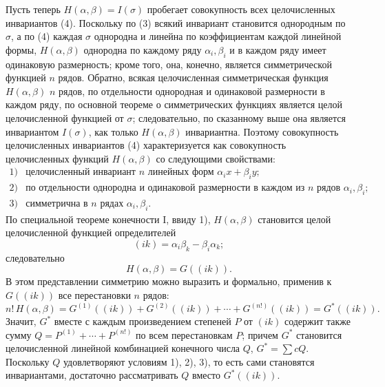 \documentclass[11pt]{article}
\begin{document}
Пусть теперь \(H(\alpha,\beta)=I(\sigma)\) пробегает совокупность всех целочисленных инвариантов (4). Поскольку по (3) всякий инвариант становится однородным по \(\sigma\), а по (4) каждая \(\sigma\) однородна и линейна по коэффициентам каждой линейной формы, \(H(\alpha,\beta)\) однородна по каждому ряду \(\alpha_i,\beta_i\) и в каждом ряду имеет одинаковую размерность; кроме того, она, конечно, является симметрической функцией \(n\) рядов. Обратно, всякая целочисленная симметрическая функция \(H(\alpha,\beta)\) \(n\) рядов, по отдельности однородная и одинаковой размерности в каждом ряду, по основной теореме о симметрических функциях является целой целочисленной функцией от \(\sigma\); следовательно, по сказанному выше она является инвариантом \(I(\sigma)\), как только \(H(\alpha,\beta)\) инвариантна. Поэтому совокупность целочисленных инвариантов (4) характеризуется как совокупность целочисленных функций \(H(\alpha,\beta)\) со следующими свойствами:
\[
\begin{array}{ll}
1) & \text{целочисленный инвариант \(n\) линейных форм \(\alpha_i x+\beta_i y\);}\\
2) & \text{по отдельности однородна и одинаковой размерности в каждом из \(n\) рядов \(\alpha_i,\beta_i\);}\\
3) & \text{симметрична в \(n\) рядах \(\alpha_i,\beta_i\).}
\end{array}
\]
По специальной теореме конечности I, ввиду 1), \(H(\alpha,\beta)\) становится целой целочисленной функцией определителей
\[
        (ik)=\alpha_i\beta_k-\beta_i\alpha_k;
\]
следовательно
\[
        H(\alpha,\beta)=G((ik)).
\]
В этом представлении симметрию можно выразить и формально, применив к \(G((ik))\) все перестановки \(n\) рядов:
\begin{equation}
        n!\,H(\alpha,\beta)
        =
        G^{(1)}((ik))+G^{(2)}((ik))+\cdots+G^{(n!)}((ik))
        =G^*((ik)).
\end{equation}
Значит, \(G^*\) вместе с каждым произведением степеней \(P\) от \((ik)\) содержит также сумму \(Q=P^{(1)}+\cdots+P^{(n!)}\) по всем перестановкам \(P\); причем \(G^*\) становится целочисленной линейной комбинацией конечного числа \(Q\), \(G^*=\sum cQ\). Поскольку \(Q\) удовлетворяют условиям 1), 2), 3), то есть сами становятся инвариантами, достаточно рассматривать \(Q\) вместо \(G^*((ik))\).
\end{document}
